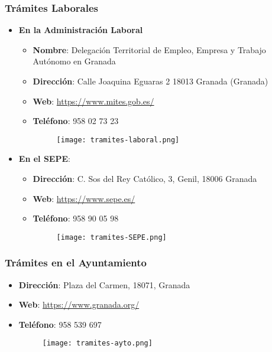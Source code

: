 \subsubsection*{Trámites Laborales}

\begin{itemize}
    \item \textbf{En la Administración Laboral}
    \begin{itemize}
        \item \textbf{Nombre}: Delegación Territorial de Empleo, Empresa y Trabajo Autónomo en Granada
        \item \textbf{Dirección}: Calle Joaquina Eguaras 2 18013 Granada (Granada)
        \item \textbf{Web}: \url{https://www.mites.gob.es/}
        \item \textbf{Teléfono}: 958 02 73 23

        \begin{figure}[H]
            \centering
            \texttt{[image: tramites-laboral.png]}
        \end{figure}
    \end{itemize}
    \item \textbf{En el SEPE}:
    \begin{itemize}
        \item \textbf{Dirección}:  C. Sos del Rey Católico, 3, Genil, 18006 Granada
        \item \textbf{Web}: \url{https://www.sepe.es/}
        \item \textbf{Teléfono}: 958 90 05 98

        \begin{figure}[H]
            \centering
            \texttt{[image: tramites-SEPE.png]}
        \end{figure}
    \end{itemize}
\end{itemize}

\subsubsection*{Trámites en el Ayuntamiento}
\begin{itemize}
    \item \textbf{Dirección}:  Plaza del Carmen, 18071, Granada
    \item \textbf{Web}: \url{https://www.granada.org/}
    \item \textbf{Teléfono}: 958 539 697

    \begin{figure}[H]
        \centering
        \texttt{[image: tramites-ayto.png]}
    \end{figure}
\end{itemize}

